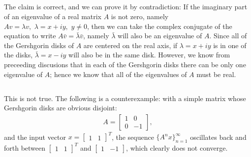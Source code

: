 \documentclass[11pt]{article}
\begin{document}
\subsection{}
The claim is correct, and we can prove it by contradiction: If the imaginary part of an eigenvalue of a real matrix $A$ is not zero, namely $Av=\lambda v,\,\,\lambda =x+iy,\,\,y\neq0$, then we can take the complex conjugate of the equation to write $A\bar v = \bar\lambda\bar v$, namely $\bar\lambda$ will also be an eigenvalue of $A$. Since all of the Gershgorin disks of $A$ are centered on the real axis, if $\lambda=x+iy$ is in one of the disks, $\bar\lambda=x-iy$ will also be in the same disk. However, we know from preceeding discusions that in each of the Gershgorin disks there can be only one eigenvalue of $A$; hence we know that all of the eigenvalues of $A$ must be real.

\subsection{}
This is not true. The following is a counterexample: with a simple matrix whose Gershgorin disks are obvious disjoint:
\begin{equation}\begin{split} 
A = \begin{bmatrix}1&0\\0&-1 \end{bmatrix}, 
\end{split}\nonumber\end{equation}
and the input vector $x = \begin{bmatrix} 1&1\end{bmatrix}^T $, the sequence $\{A^nx\}_{n=1}^{\infty}$ oscillates back and forth between $\begin{bmatrix} 1&1\end{bmatrix}^T $ and $\begin{bmatrix} 1 & -1\end{bmatrix} $, which clearly does not converge.

\section{}

\section{}
\end{document}
